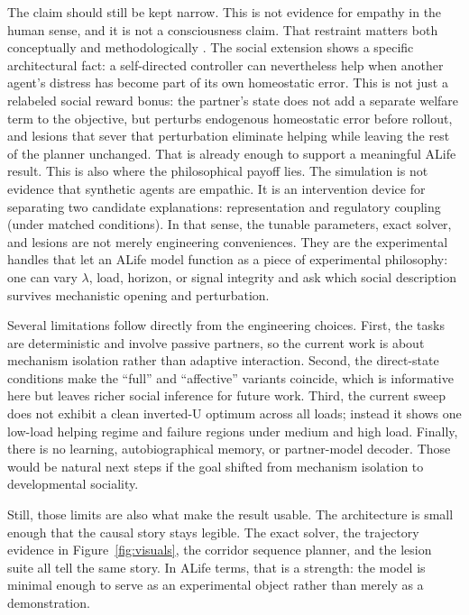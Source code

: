 \documentclass[letterpaper]{article}
\begin{document}
The claim should still be kept narrow. This is not evidence for empathy in the human sense, and it is not a consciousness claim. That restraint matters both conceptually and methodologically \citep{ButlinEtAl2025Indicators}. The social extension shows a specific architectural fact: a self-directed controller can nevertheless help when another agent's distress has become part of its own homeostatic error. This is not just a relabeled social reward bonus: the partner's state does not add a separate welfare term to the objective, but perturbs endogenous homeostatic error before rollout, and lesions that sever that perturbation eliminate helping while leaving the rest of the planner unchanged. That is already enough to support a meaningful ALife result. This is also where the philosophical payoff lies. The simulation is not evidence that synthetic agents are empathic. It is an intervention device for separating two candidate explanations: representation and regulatory coupling (under matched conditions). In that sense, the tunable parameters, exact solver, and lesions are not merely engineering conveniences. They are the experimental handles that let an ALife model function as a piece of experimental philosophy: one can vary $\lambda$, load, horizon, or signal integrity and ask which social description survives mechanistic opening and perturbation.

Several limitations follow directly from the engineering choices. First, the tasks are deterministic and involve passive partners, so the current work is about mechanism isolation rather than adaptive interaction. Second, the direct-state conditions make the ``full'' and ``affective'' variants coincide, which is informative here but leaves richer social inference for future work. Third, the current sweep does not exhibit a clean inverted-U optimum across all loads; instead it shows one low-load helping regime and failure regions under medium and high load. Finally, there is no learning, autobiographical memory, or partner-model decoder. Those would be natural next steps if the goal shifted from mechanism isolation to developmental sociality.

Still, those limits are also what make the result usable. The architecture is small enough that the causal story stays legible. The exact solver, the trajectory evidence in Figure~\ref{fig:visuals}, the corridor sequence planner, and the lesion suite all tell the same story. In ALife terms, that is a strength: the model is minimal enough to serve as an experimental object rather than merely as a demonstration.
\end{document}
